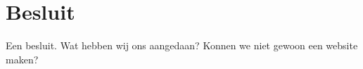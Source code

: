
\chapter{Besluit}

Een besluit.
Wat hebben wij ons aangedaan? Konnen we niet gewoon een website maken?